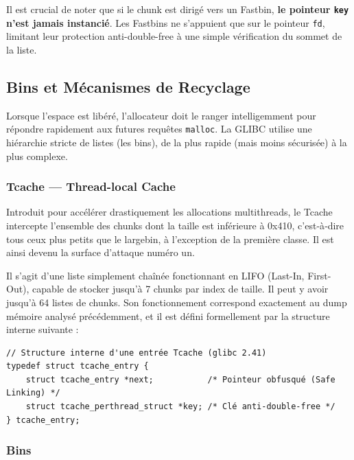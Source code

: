 Il est crucial de noter que si le chunk est dirigé vers un Fastbin, \textbf{le pointeur \texttt{key} n'est jamais instancié}. Les Fastbins ne s'appuient que sur le pointeur \texttt{fd}, limitant leur protection anti-double-free à une simple vérification du sommet de la liste.

\subsection{Bins et Mécanismes de Recyclage}

Lorsque l'espace est libéré, l'allocateur doit le ranger intelligemment pour répondre rapidement aux futures requêtes \texttt{malloc}. La GLIBC utilise une hiérarchie stricte de listes (les bins), de la plus rapide (mais moins sécurisée) à la plus complexe.

\subsubsection{Tcache --- Thread-local Cache}

Introduit pour accélérer drastiquement les allocations multithreads,
le Tcache intercepte l’ensemble des chunks dont la taille est inférieure à 0x410,
c’est‑à‑dire tous ceux plus petits que le largebin, à l’exception de la première classe.
Il est ainsi devenu la surface d’attaque numéro un.

Il s’agit d’une liste simplement chaînée fonctionnant en LIFO (Last-In, First-Out),
capable de stocker jusqu’à 7 chunks par index de taille.
Il peut y avoir jusqu’à 64 listes de chunks.
Son fonctionnement correspond exactement au dump mémoire analysé précédemment,
et il est défini formellement par la structure interne suivante :

\begin{verbatim}
// Structure interne d'une entrée Tcache (glibc 2.41)
typedef struct tcache_entry { 
    struct tcache_entry *next;           /* Pointeur obfusqué (Safe Linking) */ 
    struct tcache_perthread_struct *key; /* Clé anti-double-free */ 
} tcache_entry; 
\end{verbatim}

\subsubsection{Bins}

